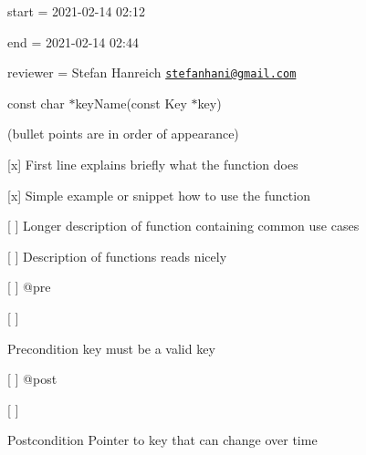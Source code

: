 
\begin{DoxyItemize}
\item start = 2021-\/02-\/14 02\+:12
\item end = 2021-\/02-\/14 02\+:44
\item reviewer = Stefan Hanreich \href{mailto:stefanhani@gmail.com}{\tt stefanhani@gmail.\+com}
\end{DoxyItemize}

{\ttfamily const char $\ast$key\+Name(const Key $\ast$key)}

(bullet points are in order of appearance)


\begin{DoxyItemize}
\item \mbox{[}x\mbox{]} First line explains briefly what the function does
\item \mbox{[}x\mbox{]} Simple example or snippet how to use the function
\item \mbox{[} \mbox{]} Longer description of function containing common use cases
\item \mbox{[} \mbox{]} Description of functions reads nicely
\item \mbox{[} \mbox{]} {\ttfamily @pre}
\begin{DoxyItemize}
\item \mbox{[} \mbox{]} \begin{DoxyPrecond}{Precondition}
key must be a valid key
\end{DoxyPrecond}

\end{DoxyItemize}
\item \mbox{[} \mbox{]} {\ttfamily @post}
\begin{DoxyItemize}
\item \mbox{[} \mbox{]} \begin{DoxyPostcond}{Postcondition}
Pointer to key that can change over time
\end{DoxyPostcond}


\end{DoxyItemize}
\end{DoxyItemize}
